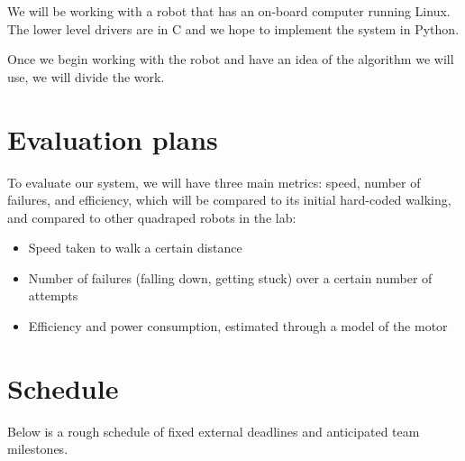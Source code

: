 We will be working with a robot that has an on-board computer running Linux. The lower level drivers are in C and we hope to implement the system in Python.

Once we begin working with the robot and have an idea of the algorithm we will use, we will divide the work.



% 
% 
% 


\section{Evaluation plans}
\label{sec:evaluation}

To evaluate our system, we will have three main metrics: speed, number
of failures, and efficiency, which will be compared to its initial
hard-coded walking, and compared to other quadraped robots in the lab:

\begin{itemize}
\item Speed taken to walk a certain distance
\item Number of failures (falling down, getting stuck) over a certain number of attempts
\item Efficiency and power consumption, estimated through a model of the motor
\end{itemize}



\section{Schedule}

Below is a rough schedule of fixed external deadlines and anticipated
team milestones.

